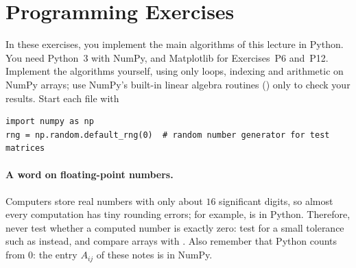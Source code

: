 \section{Programming Exercises}\label{L1-sec:programming}

\setlength{\emergencystretch}{3em}

In these exercises, you implement the main algorithms of this lecture in Python. You need Python~3 with NumPy, and Matplotlib for Exercises~P6 and~P12. Implement the algorithms yourself, using only loops, indexing and arithmetic on NumPy arrays; use NumPy's built-in linear algebra routines () only to check your results. Start each file with
\begin{lstlisting}
import numpy as np
rng = np.random.default_rng(0)  # random number generator for test matrices
\end{lstlisting}

\paragraph{A word on floating-point numbers.} Computers store real numbers with only about $16$ significant digits, so almost every computation has tiny rounding errors; for example,  is  in Python. Therefore, never test whether a computed number is exactly zero: test  for a small tolerance such as  instead, and compare arrays with . Also remember that Python counts from $0$: the entry $A_{ij}$ of these notes is  in NumPy.

